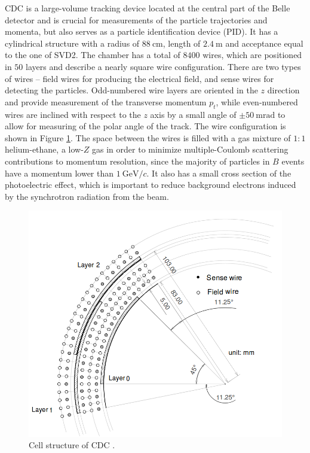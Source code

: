 \documentclass[headings=standardclasses,headings=big,oneside,a4paper,openany,12pt]{scrbook}
\newcommand {\e}[1]{\mathrm{~#1}}
\begin{document}
CDC is a large-volume tracking device located at the central part of the Belle detector and is crucial for measurements of the particle trajectories and momenta, but also serves as a particle identification device (PID). It has a cylindrical structure with a radius of $88\e{cm}$, length of $2.4\e{m}$ and acceptance equal to the one of SVD2. The chamber has a total of $8400$ wires, which are positioned in $50$ layers and describe a nearly square wire configuration. There are two types of wires -- field wires for producing the electrical field, and sense wires for detecting the particles. Odd-numbered wire layers are oriented in the $z$ direction and provide measurement of the transverse momentum $p_t$, while even-numbered wires are inclined with respect to the $z$ axis by a small angle of $\pm 50\e{mrad}$ to allow for measuring of the polar angle of the track. The wire configuration is shown in Figure \ref{fig:CDC_layout}. The space between the wires is filled with a gas mixture of $1:1$ helium-ethane, a low-$Z$ gas in order to minimize multiple-Coulomb scattering contributions to momentum resolution, since the majority of particles in $B$ events have a momentum lower than $1\e{GeV}/c$. It also has a small cross section of the photoelectric effect, which is important to reduce background electrons induced by the synchrotron radiation from the beam. 

\begin{figure}[H]
	\centering
	\captionsetup{width=0.8\linewidth}
	\includegraphics[width=0.6\linewidth]{fig/setup/CDC_layout}
	\caption{Cell structure of CDC \cite{ABASHIAN2002117}.}
	\label{fig:CDC_layout}
\end{figure}
\end{document}
